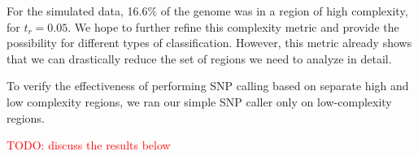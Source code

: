 \documentclass[10pt]{article}
\newcommand\TODO[1]{\textcolor{red}{TODO: #1}}
\begin{document}
For the simulated data, 16.6\% of the genome was in a region of high complexity, for $t_r =0.05$. 
We hope to further refine this complexity metric and provide the possibility for different types
of classification.  However, this metric already shows that we can drastically
reduce the set of regions we need to analyze in detail.

To verify the
effectiveness of performing SNP calling based on separate high and low
complexity regions, we ran our simple SNP caller only on low-complexity regions.

\TODO{discuss the results below}
\end{document}
